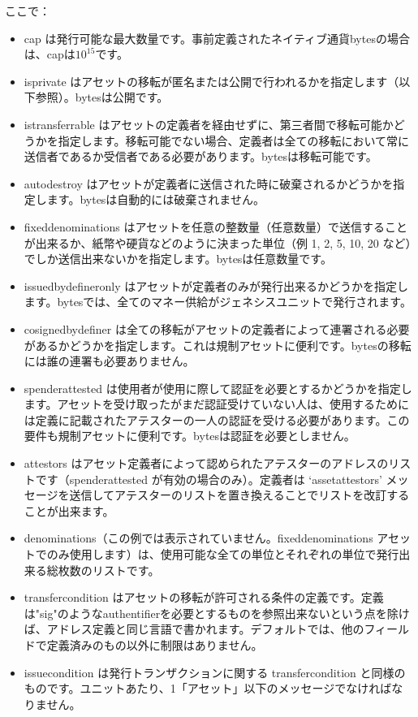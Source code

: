 \documentclass[a4paper, dvipdfmx]{jsarticle}
\begin{document}
\noindent ここで：
\begin{itemize}
    \item cap は発行可能な最大数量です。事前定義されたネイティブ通貨bytesの場合は、capは$10^{15}$です。
    \item is\textunderscore private はアセットの移転が匿名または公開で行われるかを指定します（以下参照）。bytesは公開です。
    \item is\textunderscore transferrable はアセットの定義者を経由せずに、第三者間で移転可能かどうかを指定します。移転可能でない場合、定義者は全ての移転において常に送信者であるか受信者である必要があります。bytesは移転可能です。
    \item auto\textunderscore destroy はアセットが定義者に送信された時に破棄されるかどうかを指定します。bytesは自動的には破棄されません。
    \item fixed\textunderscore denominations はアセットを任意の整数量（任意数量）で送信することが出来るか、紙幣や硬貨などのように決まった単位（例 1, 2, 5, 10, 20 など）でしか送信出来ないかを指定します。bytesは任意数量です。
    \item issued\textunderscore by\textunderscore definer\textunderscore only はアセットが定義者のみが発行出来るかどうかを指定します。bytesでは、全てのマネー供給がジェネシスユニットで発行されます。
    \item cosigned\textunderscore by\textunderscore definer は全ての移転がアセットの定義者によって連署される必要があるかどうかを指定します。これは規制アセットに便利です。bytesの移転には誰の連署も必要ありません。
    \item spender\textunderscore attested は使用者が使用に際して認証を必要とするかどうかを指定します。アセットを受け取ったがまだ認証受けていない人は、使用するためには定義に記載されたアテスターの一人の認証を受ける必要があります。この要件も規制アセットに便利です。bytesは認証を必要としません。
    \item attestors はアセット定義者によって認められたアテスターのアドレスのリストです（spender\textunderscore attested が有効の場合のみ）。定義者は ‘asset\textunderscore attestors’ メッセージを送信してアテスターのリストを置き換えることでリストを改訂することが出来ます。
    \item denominations（この例では表示されていません。fixed\textunderscore denominations アセットでのみ使用します）は、使用可能な全ての単位とそれぞれの単位で発行出来る総枚数のリストです。
    \item transfer\textunderscore condition はアセットの移転が許可される条件の定義です。定義は"sig"のようなauthentifierを必要とするものを参照出来ないという点を除けば、アドレス定義と同じ言語で書かれます。デフォルトでは、他のフィールドで定義済みのもの以外に制限はありません。
    \item issue\textunderscore condition は発行トランザクションに関する transfer\textunderscore condition と同様のものです。ユニットあたり、1「アセット」以下のメッセージでなければなりません。
\end{itemize}
\end{document}
